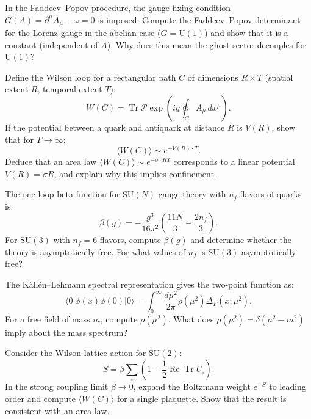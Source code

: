 \begin{exercise}
\label{ex:fadeev-popov}
In the Faddeev--Popov procedure, the gauge-fixing condition $G(A) = \partial^\mu A_\mu - \omega = 0$ is imposed. Compute the Faddeev--Popov determinant for the Lorenz gauge in the abelian case ($G = \mathrm{U}(1)$) and show that it is a constant (independent of $A$). Why does this mean the ghost sector decouples for $\mathrm{U}(1)$?
\end{exercise}

\begin{exercise}
\label{ex:wilson-loop}
Define the Wilson loop for a rectangular path $C$ of dimensions $R \times T$ (spatial extent $R$, temporal extent $T$):
\[
W(C) = \operatorname{Tr}\mathcal{P}\exp\left(ig\oint_C A_\mu \, dx^\mu\right).
\]
If the potential between a quark and antiquark at distance $R$ is $V(R)$, show that for $T \to \infty$:
\[
\langle W(C) \rangle \sim e^{-V(R) \cdot T}.
\]
Deduce that an area law $\langle W(C) \rangle \sim e^{-\sigma \cdot RT}$ corresponds to a linear potential $V(R) = \sigma R$, and explain why this implies confinement.
\end{exercise}

\begin{exercise}
\label{ex:asymptotic-freedom}
The one-loop beta function for $\mathrm{SU}(N)$ gauge theory with $n_f$ flavors of quarks is:
\[
\beta(g) = -\frac{g^3}{16\pi^2}\left(\frac{11N}{3} - \frac{2n_f}{3}\right).
\]
For $\mathrm{SU}(3)$ with $n_f = 6$ flavors, compute $\beta(g)$ and determine whether the theory is asymptotically free. For what values of $n_f$ is $\mathrm{SU}(3)$ asymptotically free?
\end{exercise}

\begin{exercise}
\label{ex:spectral-density}
The K\"{a}ll\'{e}n--Lehmann spectral representation gives the two-point function as:
\[
\langle 0 | \phi(x) \phi(0) | 0 \rangle = \int_0^\infty \frac{d\mu^2}{2\pi} \rho(\mu^2) \Delta_F(x; \mu^2).
\]
For a free field of mass $m$, compute $\rho(\mu^2)$. What does $\rho(\mu^2) = \delta(\mu^2 - m^2)$ imply about the mass spectrum?
\end{exercise}

\begin{exercise}
\label{ex:lattice-plaq}
Consider the Wilson lattice action for $\mathrm{SU}(2)$:
\[
S = \beta \sum_{\square} \left(1 - \frac{1}{2}\operatorname{Re}\operatorname{Tr} U_\square\right).
\]
In the strong coupling limit $\beta \to 0$, expand the Boltzmann weight $e^{-S}$ to leading order and compute $\langle W(C) \rangle$ for a single plaquette. Show that the result is consistent with an area law.
\end{exercise}

